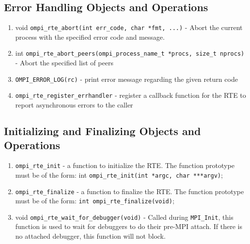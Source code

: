 \subsection{Error Handling Objects and Operations}
\begin{enumerate}
\item void \verb|ompi_rte_abort(int err_code, char *fmt, ...)| - Abort the current process with the specified error code and message.
\item int \verb|ompi_rte_abort_peers(ompi_process_name_t *procs, size_t nprocs)| - Abort the specified list of peers
\item \verb|OMPI_ERROR_LOG(rc)| - print error message regarding the given return code
\item \verb|ompi_rte_register_errhandler| - register a callback function for the RTE to report asynchronous errors to the caller
\end{enumerate}

\subsection{Initializing and Finalizing Objects and Operations}
\begin{enumerate}
\item \verb|ompi_rte_init| - a function to initialize the RTE. The function prototype must be of the form:
        int \verb|ompi_rte_init(int *argc, char ***argv)|;
\item \verb|ompi_rte_finalize| - a function to finalize the RTE. The function prototype must be of the form:
  \verb|int ompi_rte_finalize(void)|;
\item void \verb|ompi_rte_wait_for_debugger(void)| - Called during \verb|MPI_Init|, this function is used to wait for debuggers to do their pre-MPI attach.
  If there is no attached debugger, this function will not block.
\end{enumerate}

